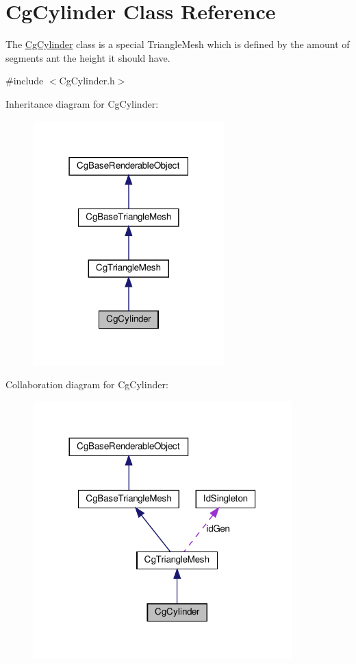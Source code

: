 \hypertarget{class_cg_cylinder}{}\section{Cg\+Cylinder Class Reference}
\label{class_cg_cylinder}


The \hyperlink{class_cg_cylinder}{Cg\+Cylinder} class is a special Triangle\+Mesh which is defined by the amount of segments ant the height it should have.  




{\ttfamily \#include $<$Cg\+Cylinder.\+h$>$}



Inheritance diagram for Cg\+Cylinder\+:
\nopagebreak
\begin{figure}[H]
\begin{center}
\leavevmode
\includegraphics[width=210pt]{class_cg_cylinder__inherit__graph}
\end{center}
\end{figure}


Collaboration diagram for Cg\+Cylinder\+:
\nopagebreak
\begin{figure}[H]
\begin{center}
\leavevmode
\includegraphics[width=284pt]{class_cg_cylinder__coll__graph}
\end{center}
\end{figure}
